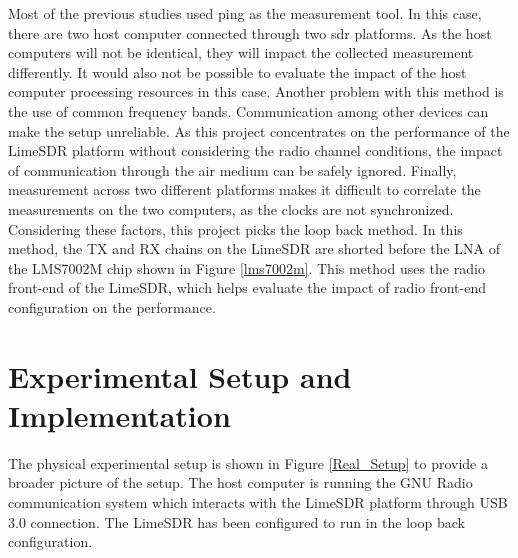 Most of the previous studies used ping as the measurement tool.
In this case, there are two host computer connected through two \ac{sdr} platforms.
As the host computers will not be identical, they will impact the collected measurement differently.
It would also not be possible to evaluate the impact of the host computer processing resources in this case.
Another problem with this method is the use of common frequency bands.
Communication among other devices can make the setup unreliable.
As this project concentrates on the performance of the LimeSDR platform without considering the radio channel conditions, the impact of communication through the air medium can be safely ignored.
Finally, measurement across two different platforms makes it difficult to correlate the measurements on the two computers, as the clocks are not synchronized.
Considering these factors, this project picks the loop back method.
In this method, the TX and RX chains on the LimeSDR are shorted before the \ac{LNA} of the LMS7002M chip shown in Figure \ref{lms7002m}.
This method uses the radio front-end of the LimeSDR, which helps evaluate the impact of radio front-end configuration on the performance.




\section{Experimental Setup and Implementation}
The physical experimental setup is shown in Figure \ref{Real_Setup} to provide a broader picture of the setup.
The host computer is running the GNU Radio communication system which interacts with the LimeSDR platform through \ac{USB} 3.0 connection.
The LimeSDR has been configured to run in the loop back configuration.\\

